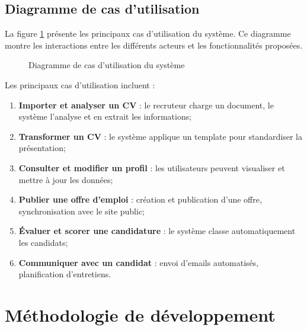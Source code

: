 \subsection{Diagramme de cas d'utilisation}
\label{subsec:diagramme-cas-utilisation}

La figure \ref{fig:use-case-diagram} présente les principaux cas d'utilisation du système. Ce diagramme montre les interactions entre les différents acteurs et les fonctionnalités proposées.

\begin{figure}[!ht]
    \centering
    \caption{Diagramme de cas d'utilisation du système}
    \label{fig:use-case-diagram}
\end{figure}

Les principaux cas d'utilisation incluent :

\begin{enumerate}
    \item \textbf{Importer et analyser un CV} : le recruteur charge un document, le système l'analyse et en extrait les informations;
    
    \item \textbf{Transformer un CV} : le système applique un template pour standardiser la présentation;
    
    \item \textbf{Consulter et modifier un profil} : les utilisateurs peuvent visualiser et mettre à jour les données;
    
    \item \textbf{Publier une offre d'emploi} : création et publication d'une offre, synchronisation avec le site public;
    
    \item \textbf{Évaluer et scorer une candidature} : le système classe automatiquement les candidats;
    
    \item \textbf{Communiquer avec un candidat} : envoi d'emails automatisés, planification d'entretiens.
\end{enumerate}


\section{Méthodologie de développement}
\label{sec:methodologie}

